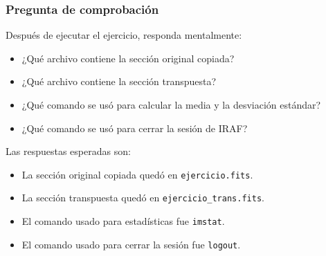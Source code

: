 \subsubsection*{Pregunta de comprobación}

Después de ejecutar el ejercicio, responda mentalmente:

\begin{itemize}
    \item ¿Qué archivo contiene la sección original copiada?
    \item ¿Qué archivo contiene la sección transpuesta?
    \item ¿Qué comando se usó para calcular la media y la desviación estándar?
    \item ¿Qué comando se usó para cerrar la sesión de IRAF?
\end{itemize}

Las respuestas esperadas son:

\begin{itemize}
    \item La sección original copiada quedó en \texttt{ejercicio.fits}.
    \item La sección transpuesta quedó en \texttt{ejercicio\_trans.fits}.
    \item El comando usado para estadísticas fue \texttt{imstat}.
    \item El comando usado para cerrar la sesión fue \texttt{logout}.
\end{itemize}